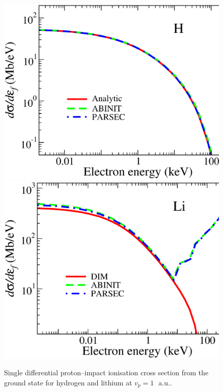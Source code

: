 \documentclass[10pt]{article}
\begin{document}
\begin{figure}[H]
\centering
 \includegraphics[height=0.225\textheight]{figures/pseudopot/ionizationH.eps}
 \hspace{0.2cm}
 \includegraphics[height=0.225\textheight]{figures/pseudopot/ionizationLi.eps}
 \caption{Single differential proton--impact ionisation cross 
 section from the ground state for hydrogen and lithium at 
 \mbox{$v_p=1$\, a.u..}}
 \label{fig:ionHLi}
\end{figure}

\end{document}
